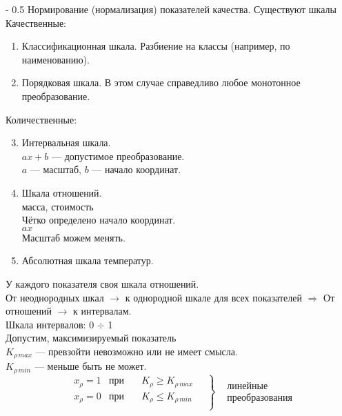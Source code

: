 \documentclass[12pt,a5paper]{scrbook}
\makeatletter
\renewcommand\paragraph{\@startsection{paragraph}{4}{0mm}%
{-\baselineskip} %
{0.5\baselineskip} %
{\normalfont\bfseries}}%
\makeatother
\begin{document}
  \paragraph{Нормирование (нормализация) показателей качества.}
  Существуют шкалы\\
  Качественные:
  \begin{enumerate}
    \item Классификационная шкала.
    Разбиение на классы (например, по наименованию).
    \item Порядковая шкала.
    В этом случае справедливо любое монотонное преобразование.
  \end{enumerate}
  Количественные:
  \begin{enumerate}
    \setcounter{enumi}{2}
    \item Интервальная шкала.\\
    $ax+b$ --- допустимое преобразование.\\
    $a$ --- масштаб, $b$ --- начало координат.
    \item Шкала отношений.\\
    масса, стоимость\\
    Чётко определено начало координат.\\
    $ax$\\
    Масштаб можем менять.
    \item Абсолютная шкала температур.
  \end{enumerate}
  
  У каждого показателя своя шкала отношений.\\
  От неоднородных шкал $\rightarrow$ к однородной шкале для всех показателей $\Rightarrow$ От отношений $\rightarrow$ к интервалам.\\
  
  Шкала интервалов: 0 $\div$ 1\\
  Допустим, максимизируемый показатель\\ 
  $K_{\rho\,max}$ --- превзойти невозможно или не имеет смысла.\\
  $K_{\rho\,min}$ --- меньше быть не может. 
  \[
    \left.
    \begin{aligned}
      &x_{\rho}=1 &\text{при}\quad &K_{\rho} \geq K_{\rho\,max}\\
      &x_{\rho}=0 &\text{при}\quad &K_{\rho} \leq K_{\rho\,min}\\
    \end{aligned}
    \quad\right\}
    \begin{aligned}
      &\text{линейные}\\
      &\text{преобразования}
    \end{aligned}
  \]
  
\end{document}
